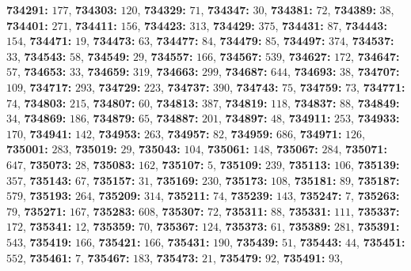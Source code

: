 \textsf{\bfseries 734291:} $177$, \textsf{\bfseries 734303:} $120$, \textsf{\bfseries 734329:} $71$, \textsf{\bfseries 734347:} $30$, \textsf{\bfseries 734381:} $72$, \textsf{\bfseries 734389:} $38$, \textsf{\bfseries 734401:} $271$, \textsf{\bfseries 734411:} $156$, \textsf{\bfseries 734423:} $313$, \textsf{\bfseries 734429:} $375$, \textsf{\bfseries 734431:} $87$, \textsf{\bfseries 734443:} $154$, \textsf{\bfseries 734471:} $19$, \textsf{\bfseries 734473:} $63$, \textsf{\bfseries 734477:} $84$, \textsf{\bfseries 734479:} $85$, \textsf{\bfseries 734497:} $374$, \textsf{\bfseries 734537:} $33$, \textsf{\bfseries 734543:} $58$, \textsf{\bfseries 734549:} $29$, \textsf{\bfseries 734557:} $166$, \textsf{\bfseries 734567:} $539$, \textsf{\bfseries 734627:} $172$, \textsf{\bfseries 734647:} $57$, \textsf{\bfseries 734653:} $33$, \textsf{\bfseries 734659:} $319$, \textsf{\bfseries 734663:} $299$, \textsf{\bfseries 734687:} $644$, \textsf{\bfseries 734693:} $38$, \textsf{\bfseries 734707:} $109$, \textsf{\bfseries 734717:} $293$, \textsf{\bfseries 734729:} $223$, \textsf{\bfseries 734737:} $390$, \textsf{\bfseries 734743:} $75$, \textsf{\bfseries 734759:} $73$, \textsf{\bfseries 734771:} $74$, \textsf{\bfseries 734803:} $215$, \textsf{\bfseries 734807:} $60$, \textsf{\bfseries 734813:} $387$, \textsf{\bfseries 734819:} $118$, \textsf{\bfseries 734837:} $88$, \textsf{\bfseries 734849:} $34$, \textsf{\bfseries 734869:} $186$, \textsf{\bfseries 734879:} $65$, \textsf{\bfseries 734887:} $201$, \textsf{\bfseries 734897:} $48$, \textsf{\bfseries 734911:} $253$, \textsf{\bfseries 734933:} $170$, \textsf{\bfseries 734941:} $142$, \textsf{\bfseries 734953:} $263$, \textsf{\bfseries 734957:} $82$, \textsf{\bfseries 734959:} $686$, \textsf{\bfseries 734971:} $126$, \textsf{\bfseries 735001:} $283$, \textsf{\bfseries 735019:} $29$, \textsf{\bfseries 735043:} $104$, \textsf{\bfseries 735061:} $148$, \textsf{\bfseries 735067:} $284$, \textsf{\bfseries 735071:} $647$, \textsf{\bfseries 735073:} $28$, \textsf{\bfseries 735083:} $162$, \textsf{\bfseries 735107:} $5$, \textsf{\bfseries 735109:} $239$, \textsf{\bfseries 735113:} $106$, \textsf{\bfseries 735139:} $357$, \textsf{\bfseries 735143:} $67$, \textsf{\bfseries 735157:} $31$, \textsf{\bfseries 735169:} $230$, \textsf{\bfseries 735173:} $108$, \textsf{\bfseries 735181:} $89$, \textsf{\bfseries 735187:} $579$, \textsf{\bfseries 735193:} $264$, \textsf{\bfseries 735209:} $314$, \textsf{\bfseries 735211:} $74$, \textsf{\bfseries 735239:} $143$, \textsf{\bfseries 735247:} $7$, \textsf{\bfseries 735263:} $79$, \textsf{\bfseries 735271:} $167$, \textsf{\bfseries 735283:} $608$, \textsf{\bfseries 735307:} $72$, \textsf{\bfseries 735311:} $88$, \textsf{\bfseries 735331:} $111$, \textsf{\bfseries 735337:} $172$, \textsf{\bfseries 735341:} $12$, \textsf{\bfseries 735359:} $70$, \textsf{\bfseries 735367:} $124$, \textsf{\bfseries 735373:} $61$, \textsf{\bfseries 735389:} $281$, \textsf{\bfseries 735391:} $543$, \textsf{\bfseries 735419:} $166$, \textsf{\bfseries 735421:} $166$, \textsf{\bfseries 735431:} $190$, \textsf{\bfseries 735439:} $51$, \textsf{\bfseries 735443:} $44$, \textsf{\bfseries 735451:} $552$, \textsf{\bfseries 735461:} $7$, \textsf{\bfseries 735467:} $183$, \textsf{\bfseries 735473:} $21$, \textsf{\bfseries 735479:} $92$, \textsf{\bfseries 735491:} $93$, 
